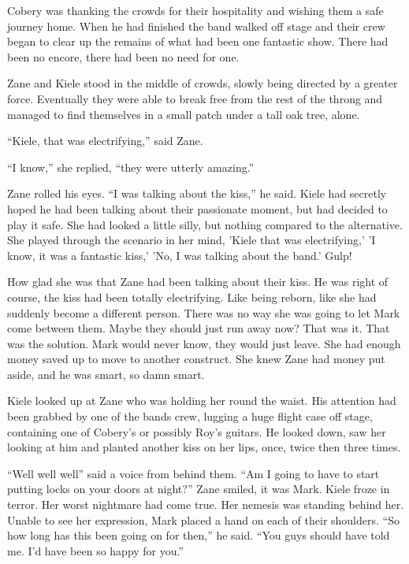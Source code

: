 Cobery was thanking the crowds for their hospitality and wishing them a safe journey home.  When he had finished the band walked off stage and their crew began to clear up the remains of what had been one fantastic show.  There had been no encore, there had been no need for one.

Zane and Kiele stood in the middle of crowds, slowly being directed by a greater force.  Eventually they were able to break free from the rest of the throng and managed to find themselves in a small patch under a tall oak tree, alone.  

``Kiele, that was electrifying,'' said Zane.

``I know,'' she replied, ``they were utterly amazing.''

Zane rolled his eyes.  ``I was talking about the kiss,'' he said.  Kiele had secretly hoped he had been talking about their passionate moment, but had decided to play it safe.  She had looked a little silly, but nothing compared to the alternative.  She played through the scenario in her mind, 'Kiele that was electrifying,' 'I know, it was a fantastic kiss,' 'No, I was talking about the band.' Gulp!

How glad she was that Zane had been talking about their kiss.  He was right of course, the kiss had been totally electrifying.  Like being reborn, like she had suddenly become a different person.  There was no way she was going to let Mark come between them.  Maybe they should just run away now?  That was it.  That was the solution.  Mark would never know, they would just leave.  She had enough money saved up to move to another construct.  She knew Zane had money put aside, and he was smart, so damn smart.

Kiele looked up at Zane who was holding her round the waist.  His attention had been grabbed by one of the bands crew, lugging a huge flight case off stage, containing one of Cobery's or possibly Roy's guitars.  He looked down, saw her looking at him and planted another kiss on her lips, once, twice then three times.

``Well well well'' said a voice from behind them.  ``Am I going to have to start putting locks on your doors at night?''  Zane smiled, it was Mark.  Kiele froze in terror.  Her worst nightmare had come true.  Her nemesis was standing behind her.  Unable to see her expression, Mark placed a hand on each of their shoulders.  ``So how long has this been going on for then,'' he said.  ``You guys should have told me.  I'd have been so happy for you.''

